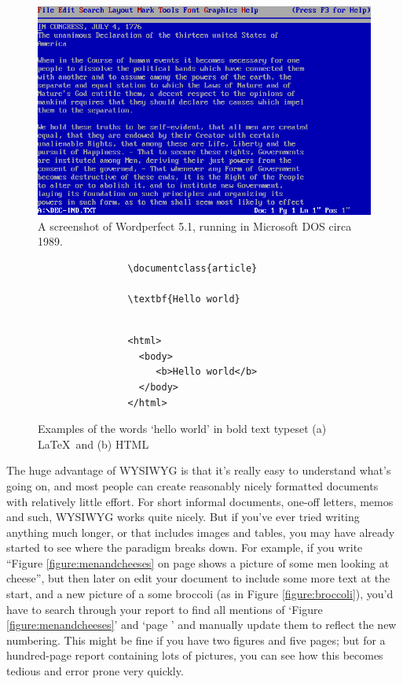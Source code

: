 \begin{figure}
\centerline{\includegraphics[width=12cm]{images/wordperfect.png}}
\caption{A screenshot of Wordperfect 5.1, running in Microsoft DOS circa 1989.}\label{figure:wordperfect}
\end{figure}

\begin{figure}

\begin{verbatim}
                \documentclass{article}
                
                \textbf{Hello world}
                
\end{verbatim}
\begin{verbatim}
                <html>
                  <body>
                     <b>Hello world</b>
                  </body>
                </html>
\end{verbatim}

\caption{Examples of the words `hello world' in bold text typeset (a) \LaTeX\ and (b) HTML}\label{figure:helloworld}
\end{figure}


The huge advantage of WYSIWYG is that it's really easy to understand what's going on, and most people can create reasonably nicely formatted documents with relatively little effort. For short informal documents, one-off letters, memos and such, WYSIWYG works quite nicely. But if you've ever tried writing anything much longer, or that includes images and tables, you may have already started to see where the paradigm breaks down. For example, if you write ``Figure \ref{figure:menandcheeses} on page \pageref{figure:menandcheeses}  shows a picture of some men looking at cheese'', but then later on edit your document to include some more text at the start, and a new picture of a some broccoli (as in Figure \ref{figure:broccoli}), you'd have to search through your report to find all mentions of `Figure \ref{figure:menandcheeses}' and `page \pageref{figure:menandcheeses}' and manually update them to reflect the new numbering. This might be fine if you have two figures and five pages; but for a hundred-page report containing lots of pictures, you can see how this becomes tedious and error prone very quickly. 

